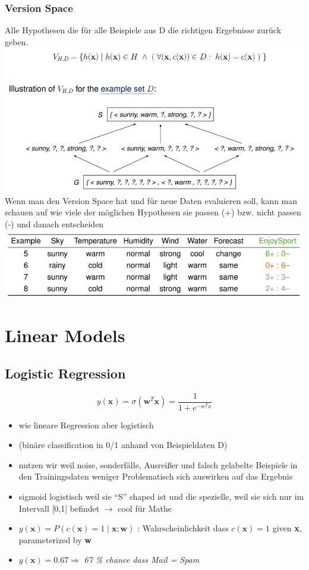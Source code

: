 \documentclass[11pt,a4paper]{article}
\begin{document}
\begin{flushleft}
\subsubsection{Version Space}
Alle Hypothesen die für alle Beispiele aus D die richtigen Ergebnisse zurück geben.
\includegraphics[width=\textwidth]{VersionSpace}
Wenn man den Version Space hat und für neue Daten evaluieren soll, kann man schauen auf wie viele der möglichen Hypothesen sie passen (+) bzw. nicht passen (-) und danach entscheiden
\includegraphics[width=\textwidth]{VSBeispiel}

\section{Linear Models}
\subsection{Logistic Regression}
$$ y(\textbf{x}) = \sigma (\textbf{w}^{T} \textbf{x}) = \frac{1}{1+ e^{-w^Tx}} $$
\begin{itemize}
\item wie lineare Regression aber logistisch
\item(binäre classification in 0/1 anhand von Beispieldaten D)
\item nutzen wir weil noise, sonderfälle, Ausreißer und falsch gelabelte Beispiele in den Trainingsdaten weniger Problematisch sich auswirken auf das Ergebnis
\item sigmoid logistisch weil sie “S” shaped ist und die spezielle, weil sie sich nur im Intervall [0,1] befindet $\rightarrow$ cool für Mathe
\item $y(\textbf{x}) = P(c(\textbf{x})= 1 \mid \textbf{x};\textbf{w})$ : Wahrscheinlichkeit dass $c(\textbf{x}) = 1$ given \textbf{x}, parameterized by \textbf{w}
\item $ y(\textbf{x}) = 0.67 \Rightarrow $ \textit{67 \% chance dass Mail = Spam }
\end{itemize}


\end{flushleft}
\end{document}
